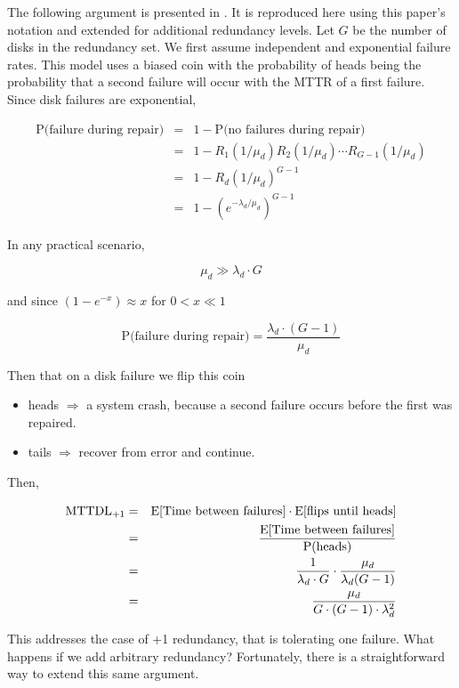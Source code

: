 \documentclass[11pt]{article}
\newcommand{\prob}[1]{\textrm{P(#1)}}
\numberwithin{equation}{section}
\begin{document}
The following argument is presented in \cite{raid}.  It is reproduced here
using this paper's notation and extended for additional redundancy levels.
Let $G$ be the number of disks in the redundancy set.  We first assume
independent and exponential failure rates.  This model uses a biased coin with
the probability of heads being the probability that a second failure will
occur with the MTTR of a first failure.  Since disk failures are exponential,

\begin{eqnarray}
\textrm{P(failure during repair)} & = & 1 - \prob{no failures during repair} 
\\
& = & 
1 - R_{1}(1/\mu_{d}) R_{2}(1/\mu_{d}) \cdots R_{G-1}(1/\mu_{d})
\\
& = & 
1 - R_{d}(1/\mu_{d})^{G - 1}
\\
& = & 1 - (e^{-\lambda_{d}/\mu_{d}})^{G-1} 
\end{eqnarray}

In any practical scenario,

$$\mu_{d} \gg \lambda_{d} \cdot G$$

and since $(1 - e^{-x}) \approx x$ for $0 < x \ll 1$


$$\textrm{P(failure during repair)} = \frac{\lambda_{d}\cdot (G-1)}{\mu_{d}}$$

Then that on a disk failure we flip this coin
\begin{itemize}
\item[] heads $\Rightarrow$ a system crash, because a second failure occurs
before the first was repaired.
\item[] tails $\Rightarrow$ recover from error and continue.
\end{itemize}

Then,

\begin{eqnarray}
{\rm MTTDL_{+1}} & = & \textrm{E[Time between failures]} \cdot 
\textrm{E[flips until heads]} 
\\
& = & \frac{\textrm{E[Time between failures]}}{\textrm{P(heads)}} 
\\
& = & \frac{1}{\lambda_{d} \cdot G} \cdot 
\frac{\mu_{d}}{\lambda_{d} (G-1)} 
\\
& = & \frac{\mu_{d}}{G \cdot (G-1) \cdot \lambda_{d}^{2}} 
\end{eqnarray}

This addresses the case of +1 redundancy, that is tolerating one failure.  What
happens if we add arbitrary redundancy?  Fortunately, there is a
straightforward way to extend this same argument.  
\end{document}
